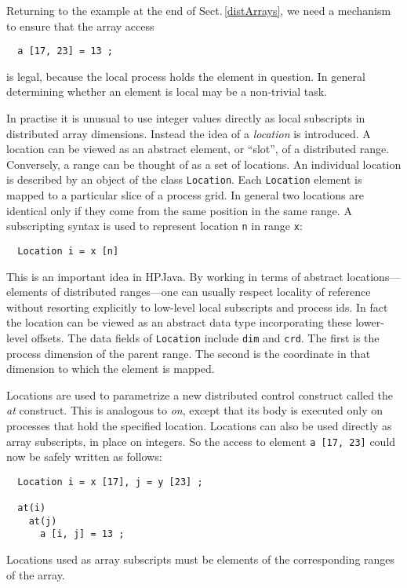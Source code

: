 Returning to the example at the end of Sect.\,\ref{distArrays},
we need a mechanism to ensure that the array access
\small
\begin{verbatim}
  a [17, 23] = 13 ;
\end{verbatim}
\normalsize
is legal, because the local process holds the element in question.  In
general determining whether an element is local may be a non-trivial
task.

In practise it is unusual to use integer values directly as local
subscripts in distributed array dimensions.
Instead the idea of a {\em location} is introduced.  A
location can be viewed as an abstract element, or ``slot'', of a
distributed range.
Conversely, a range can be thought of as a set of locations.
An individual location is described by an object of the class {\tt Location}.
Each {\tt Location} element is mapped
to a particular slice of a process grid.
In general two locations are identical only
if they come from the same position in the same range.
A subscripting syntax is used to represent
location {\tt n} in range {\tt x}:
\small
\begin{verbatim}
  Location i = x [n]
\end{verbatim}
\normalsize


This is an important idea in HPJava.  By working in terms of
abstract loca\-tions---elements of distributed ranges---one can usually
respect locality of reference without resorting explicitly to low-level
local subscripts and process ids.  In fact the location can be viewed
as an abstract data type incorporating these lower-level offsets.
The data fields of {\tt Location} include {\tt dim}
and {\tt crd}.  The first is the process dimension of the parent
range.  The second is the coordinate in that dimension to which the element
is mapped.

Locations are used to parametrize a new distributed control
construct called the {\em at} construct.  This
is analogous to {\em on}, except that its
body is executed only on processes that hold the specified location.
Locations can also be used directly as array subscripts, in place on
integers.  So the access to element {\tt a [17, 23]}
could now be safely written as follows:
\small
\begin{verbatim}
  Location i = x [17], j = y [23] ;

  at(i)
    at(j)
      a [i, j] = 13 ;
\end{verbatim}
\normalsize
Locations used as array subscripts must be elements of the
corresponding ranges of the array.


